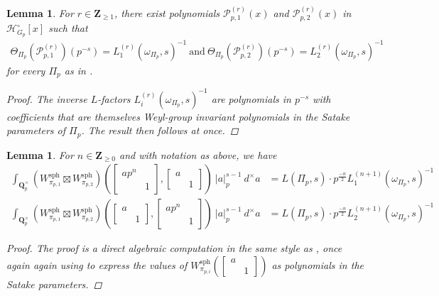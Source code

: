 \documentclass{amsart}%
\theoremstyle{plain}
\newtheorem{lem}[thm]{Lemma}
\theoremstyle{plain}
\theoremstyle{remark}
\begin{document}
\begin{lem}
    For $r\in\mathbf{Z}_{\geq 1}$, there exist polynomials $\mathcal{P}_{p,1}^{(r)}(x)$ and $\mathcal{P}_{p,2}^{(r)}(x)$ in $\mathcal{H}_{G_p}^\circ[x]$ such that
    \begin{align*}
\Theta_{\Pi_p}\left(\mathcal{P}_{p,1}^{(r)}\right)(p^{-s})= L_1^{(r)}(\omega_{\Pi_p},s)^{-1}\ \mathrm{and}\ 
\Theta_{\Pi_p}\left(\mathcal{P}_{p,2}^{(r)}\right)(p^{-s})=L_2^{(r)}(\omega_{\Pi_p},s)^{-1}
    \end{align*}
    for every $\Pi_p$ as in \emph{}.
    \begin{proof}
        The inverse $L$-factors $L_i^{(r)}(\omega_{\Pi_p},s)^{-1}$ are polynomials in $p^{-s}$ with coefficients that are themselves Weyl-group invariant polynomials in the Satake parameters of $\Pi_p$. The result then follows at once.
    \end{proof}
\end{lem}
\begin{lem}\label{lem two integrals}
   For $n\in\mathbf{Z}_{\geq 0}$ and with notation as above, we have 
\begin{align*}\int_{\mathbf{Q}_p^\times}\left(W_{\pi_{p,1}}^\mathrm{sph}\boxtimes W_{\pi_{p,2}}^\mathrm{sph}\right)\left(\left[\begin{smallmatrix}
        ap^n & \\
        & 1
\end{smallmatrix}\right],\left[\begin{smallmatrix}
        a & \\
        & 1
    \end{smallmatrix}\right]\right)\ |a|_p^{s-1}\ d^\times a &=L(\Pi_p,s)\cdot p^\frac{-n}{2}L_1^{(n+1)}(\omega_{\Pi_p},s)^{-1}\\
    \int_{\mathbf{Q}_p^\times}\left(W_{\pi_{p,1}}^\mathrm{sph}\boxtimes W_{\pi_{p,2}}^\mathrm{sph}\right)\left(\left[\begin{smallmatrix}
        a & \\
        & 1
\end{smallmatrix}\right],\left[\begin{smallmatrix}
        ap^n & \\
        & 1
    \end{smallmatrix}\right]\right)\ |a|_p^{s-1}\ d^\times a &=L(\Pi_p,s)\cdot p^\frac{-n}{2}L_2^{(n+1)}(\omega_{\Pi_p},s)^{-1}
    \end{align*}
    \begin{proof}
        The proof is a direct algebraic computation in the same style as \cite[Lemma $3.3.2$]{grossi2020norm}, once again again using \cite{shintani1976explicit} to express the values of $W_{\pi_{p,i}}^\mathrm{sph}(\left[\begin{smallmatrix}
            a & \\
            & 1
        \end{smallmatrix}\right])$ as polynomials in the Satake parameters.
    \end{proof}
\end{lem}
\end{document}
